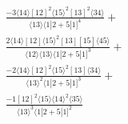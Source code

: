 \documentclass[varwidth, border=5pt]{standalone}
\begin{document}
\begin{my}
$\begin{gathered}
\scriptscriptstyle\frac{-3⟨14⟩[12]^2⟨15⟩^2[13]^2⟨34⟩}{⟨13⟩⟨1|2+5|1]^4}+\\
\scriptscriptstyle\frac{2⟨14⟩[12]⟨15⟩^2[13][15]⟨45⟩}{⟨12⟩⟨13⟩⟨1|2+5|1]^3}+\\
\scriptscriptstyle\frac{-2⟨14⟩[12]^2⟨15⟩^2[13]⟨34⟩}{⟨13⟩^2⟨1|2+5|1]^3}+\\
\scriptscriptstyle\frac{-1[12]^2⟨15⟩⟨14⟩^2⟨35⟩}{⟨13⟩^3⟨1|2+5|1]^2}\phantom{+}
\end{gathered}$
\end{my}
\end{document}

